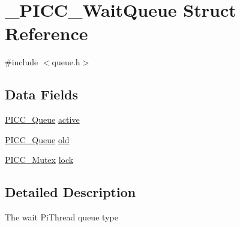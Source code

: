 \hypertarget{struct__PICC__WaitQueue}{\section{\-\_\-\-P\-I\-C\-C\-\_\-\-Wait\-Queue Struct Reference}
\label{struct__PICC__WaitQueue}
}


{\ttfamily \#include $<$queue.\-h$>$}

\subsection*{Data Fields}
{\bf }\par
\begin{DoxyCompactItemize}
\item 
\hyperlink{queue_8h_ae5dce037e07e8fe39960a37b09cd626d}{P\-I\-C\-C\-\_\-\-Queue} \hyperlink{struct__PICC__WaitQueue_a8bc57db481c3efd09e121edd43914dfc}{active}
\item 
\hyperlink{queue_8h_ae5dce037e07e8fe39960a37b09cd626d}{P\-I\-C\-C\-\_\-\-Queue} \hyperlink{struct__PICC__WaitQueue_a06098ffdc6ff1893efc3c1017b4d9c5c}{old}
\item 
\hyperlink{sync_8h_a600a20a1dd394c06182a81d72e3357f4}{P\-I\-C\-C\-\_\-\-Mutex} \hyperlink{struct__PICC__WaitQueue_a7cb57783c5f64a4f7fa03ce08cd6440c}{lock}
\end{DoxyCompactItemize}



\subsection{Detailed Description}
The wait Pi\-Thread queue type 

